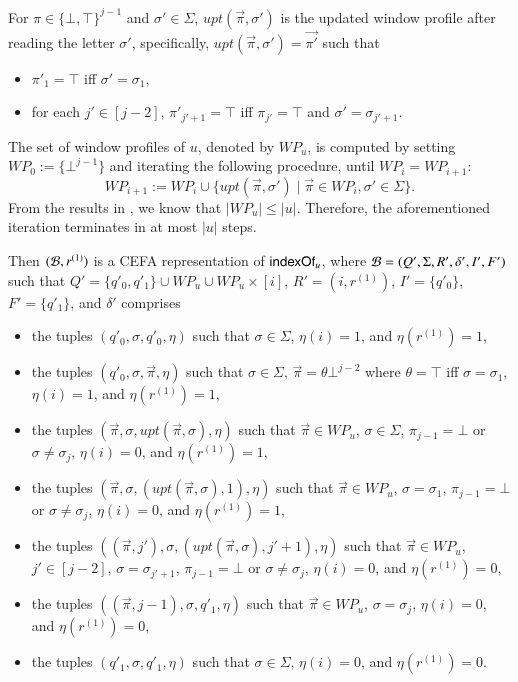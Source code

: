 \documentclass{llncs}
\begin{document}
For $\pi \in \{\bot, \top\}^{j-1}$ and $\sigma' \in \Sigma$, $upt(\vec{\pi}, \sigma')$ is the updated window profile after reading the letter $\sigma'$, specifically, $upt(\vec{\pi}, \sigma') = \vec{\pi'}$ such that  
\begin{itemize}
\item $\pi'_1 = \top$ iff $\sigma' = \sigma_1$, 
%
\item for each $j' \in [j-2]$, $\pi'_{j'+1} = \top$ iff $\pi_{j'} = \top$ and $\sigma' = \sigma_{j'+1}$. 
\end{itemize}
The set of window profiles of $u$, denoted by $WP_u$, is computed by setting $WP_0 := \{\bot^{j-1}\}$ and iterating the following procedure, until $WP_i = WP_{i+1}$:
\[WP_{i+1}:=WP_i \cup \{upt(\vec{\pi}, \sigma') \mid \vec{\pi} \in WP_i, \sigma' \in \Sigma\}.\] 
From the results in \cite{CCH+18}, we know that $|WP_u| \le |u|$. Therefore, the aforementioned iteration terminates in at most $|u|$ steps.


Then $(\mathcal{B}, r^{(1)})$ is a CEFA representation of $\mathsf{indexOf}_u$, where 
$\mathcal{B}= (Q', \Sigma, R', \delta', I', F')$ such that  $Q' = \{q'_0, q'_1\} \cup WP_u \cup WP_u \times [i]$, $R'=(i, r^{(1)})$, $I'=\{q'_0\}$, $F'=\{q'_1\}$, and $\delta'$ comprises 
\begin{itemize}
\item the tuples $(q'_0, \sigma, q'_0, \eta)$ such that $\sigma \in \Sigma$, $\eta(i)=1$, and $\eta(r^{(1)}) = 1$,
%
\item the tuples $(q'_0, \sigma, \vec{\pi}, \eta)$ such that $\sigma \in \Sigma$, $\vec{\pi} = \theta \bot^{j-2}$ where $\theta  = \top$ iff $\sigma = \sigma_1$, $\eta(i) = 1$, and $\eta(r^{(1)})= 1$,
% 
\item the tuples  $(\vec{\pi}, \sigma, upt(\vec{\pi}, \sigma), \eta)$ such that $\vec{\pi} \in WP_u$, $\sigma \in \Sigma$, $\pi_{j-1} = \bot$ or $\sigma \neq \sigma_{j}$, $\eta(i) = 0$, and $\eta(r^{(1)})= 1$,
%
\item the tuples $(\vec{\pi}, \sigma, (upt(\vec{\pi}, \sigma), 1), \eta)$ such that $\vec{\pi} \in WP_u$, $\sigma = \sigma_1$, $\pi_{j-1} = \bot$ or $\sigma \neq \sigma_{j}$, $\eta(i) = 0$, and $\eta(r^{(1)})= 1$,
%
\item the tuples $((\vec{\pi}, j'),  \sigma, (upt(\vec{\pi}, \sigma), j'+1), \eta)$ such that $\vec{\pi} \in WP_u$, $j' \in [j-2]$, $\sigma = \sigma_{j'+1}$, $\pi_{j-1} = \bot$ or $\sigma \neq \sigma_{j}$, $\eta(i) = 0$, and $\eta(r^{(1)})= 0$,
%
\item the tuples $((\vec{\pi}, j-1),  \sigma, q'_1, \eta)$ such that $\vec{\pi} \in WP_u$, $\sigma = \sigma_{j}$, $\eta(i) =0$, and $\eta(r^{(1)})= 0$,
%
\item the tuples  $(q'_1, \sigma, q'_1, \eta)$ such that $\sigma \in \Sigma$, $\eta(i) = 0$, and $\eta(r^{(1)})= 0$.
\end{itemize}
\end{document}
